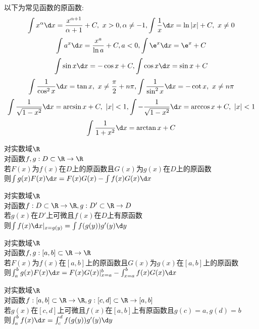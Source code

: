 \begin{zhu}
以下为常见函数的原函数:\\
\[\int x^{\alpha}\d x=\frac{x^{\alpha+1}}{\alpha+1}+C,\ x>0,\alpha\neq -1,\int \frac{1}{x}\d x=\ln|x|+C,\ x\neq0\] 
\[\int a^x\d x=\frac{x^{a}}{\ln a}+C, a<0,\int \e^x\d x=\e^x+C\]
\[\int \sin x\d x=-\cos x+C,\int\cos x\d x=\sin x+C\] 
\[\int \frac{1}{\cos^2 x}\d x=\tan x,\ x\neq \frac{\pi}{2}+n\pi,\int \frac{1}{\sin^2 x}\d x=-\cot x,\ x\neq n\pi\] 
\[\int \frac{1}{\sqrt{1-x^2}}\d x=\arcsin x+C,\ |x|<1,\int -\frac{1}{\sqrt{1-x^2}}\d x=\arccos x+C,\ |x|<1\]
\[\int \frac{1}{1+x^2}\d x=\arctan x+C\] 
\end{zhu}

\begin{dingli}
对实数域$\R$\\
对函数$f,g:D\subset \R \to \R$\\
若$F(x)$为$f(x)$在$D$上的原函数且$G(x)$为$g(x)$在$D$上的原函数\\
则$\int g(x)F(x)\d x=F(x)G(x)-\int f(x)G(x)\d x$
\end{dingli}

\begin{dingli}
对实数域$\R$\\
对函数$f:D\subset \R \to \R,g:D'\subset \R\to D$\\
若$g(x)$在$D'$上可微且$f(x)$在$D$上有原函数\\
则$\int f(x)\d x|_{x=g(y)}=\int f(g(y))g'(y)\d y$
\end{dingli}

\begin{dingli}
对实数域$\R$\\
对函数$f,g:[a,b]\subset \R \to \R$\\
若$F(x)$为$f(x)$在$[a,b]$上的原函数且$G(x)$为$g(x)$在$[a,b]$上的原函数\\
则$\int_{a}^{b} g(x)F(x)\d x=F(x)G(x)|_{x=a}^{b}-\int_{x=a}^{b} f(x)G(x)\d x$
\end{dingli}

\begin{dingli}
对实数域$\R$\\
对函数$f:[a,b]\subset \R \to \R,g:[c,d]\subset \R\to [a,b]$\\
若$g(x)$在$[c,d]$上可微且$f(x)$在$[a,b]$上有原函数且$g(c)=a,g(d)=b$\\
则$\int_{a}^{b} f(x)\d x=\int_{c}^{d}f(g(y))g'(y)\d y$
\end{dingli}

